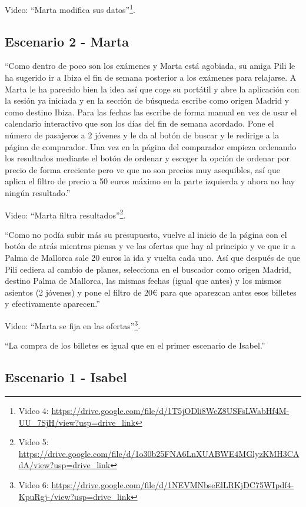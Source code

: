 Video: ``Marta modifica sus datos''\footnote{Video 4: \url{https://drive.google.com/file/d/1T5jODli8WcZ8USFsLWabHf4M-UU_7SjH/view?usp=drive_link}}.


\subsection{Escenario 2 - Marta}

``Como dentro de poco son los exámenes y Marta está agobiada, su amiga Pili le ha sugerido ir a Ibiza el fin de semana posterior a los exámenes para relajarse. A Marta le ha parecido bien la idea así que coge su portátil y abre la aplicación con la sesión ya iniciada y en la sección de búsqueda escribe como origen Madrid y como destino Ibiza. Para las fechas las escribe de forma manual en vez de usar el calendario interactivo que son los días del fin de semana acordado. Pone el número de pasajeros a 2 jóvenes y le da al botón de buscar y le redirige a la página de comparador.
Una vez en la página del comparador empieza ordenando los resultados mediante el botón de ordenar y escoger la opción de ordenar por precio de forma creciente pero ve que no son precios muy asequibles, así que aplica el filtro de precio a 50 euros máximo en la parte izquierda y ahora no hay ningún resultado.''

Video: ``Marta filtra resultados''\footnote{Video 5: \url{https://drive.google.com/file/d/1o30b25FNA6LnXUABWE4MGlyzKMH3CAdA/view?usp=drive_link}}.

``Como no podía subir más su presupuesto, vuelve al inicio de la página con el botón de atrás mientras piensa y ve las ofertas que hay al principio y ve que ir a Palma de Mallorca sale 20 euros la ida y vuelta cada uno. Así que después de que Pili cediera al cambio de planes, selecciona en el buscador como origen Madrid, destino Palma de Mallorca, las mismas fechas (igual que antes) y los mismos asientos (2 jóvenes) y pone el filtro de 20€ para que aparezcan antes esos billetes y efectivamente aparecen.''

Video: ``Marta se fija en las ofertas''\footnote{Video 6: \url{https://drive.google.com/file/d/1NEVMNbseElLRKjDC75WIpdf4-KpuRgj-/view?usp=drive_link}}.

``La compra de los billetes es igual que en el primer escenario de Isabel.''


\subsection{Escenario 1 - Isabel}

